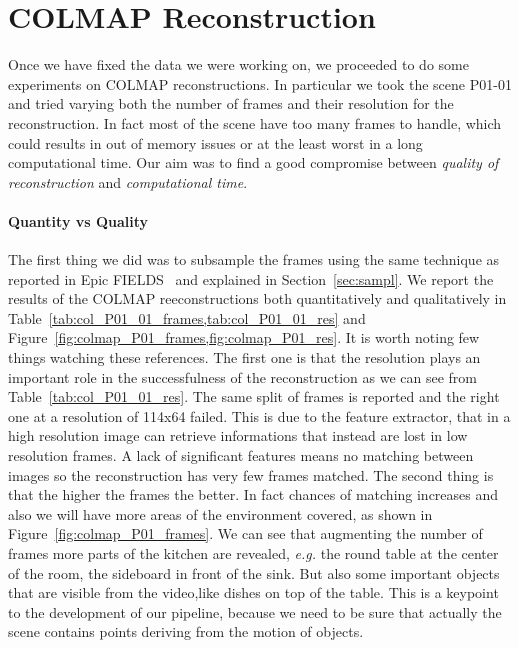 

\section{COLMAP Reconstruction}
Once we have fixed the data we were working on, we proceeded to do some experiments
on COLMAP reconstructions. In particular we took the scene P01-01 and tried varying 
both the number of frames and their resolution for the reconstruction. In fact most
of the scene have too many frames to handle, which could results in out of memory issues
or at the least worst in a long computational time. Our aim was to find a good compromise
between \textit{quality of reconstruction} and \textit{computational time}.

\paragraph{Quantity vs Quality }The first thing we did was to subsample the frames using the same technique 
as reported in Epic FIELDS~\cite{epic_fields} and explained in Section~\ref{sec:sampl}.
We report the results of the COLMAP reeconstructions both quantitatively and qualitatively
in Table~\ref{tab:col_P01_01_frames,tab:col_P01_01_res} and Figure~\ref{fig:colmap_P01_frames,fig:colmap_P01_res}. It is worth noting
few things watching these references. The first one is that the 
resolution plays an important role in the successfulness of the reconstruction as 
we can see from Table~\ref{tab:col_P01_01_res}. The same split
of frames is reported and the right one at a resolution of 114x64 failed. This 
is due to the feature extractor, that in a high resolution image can retrieve 
informations that instead are lost in low resolution frames. A lack of significant features 
means no matching between images so the reconstruction has very few frames matched.
The second thing is that the higher the frames the better. In fact chances of matching
increases and also we will have more areas of the environment covered, as shown in Figure~\ref{fig:colmap_P01_frames}.
We can see that augmenting the number of frames more parts of the kitchen are revealed,
\textit{e.g.} the round table at the center of the room, the sideboard in front of the sink.
But also some important objects that are visible from the video,like dishes on top 
of the table. This is a keypoint to the development of our pipeline, because we need to 
be sure that actually the scene contains points deriving from the motion of objects.

